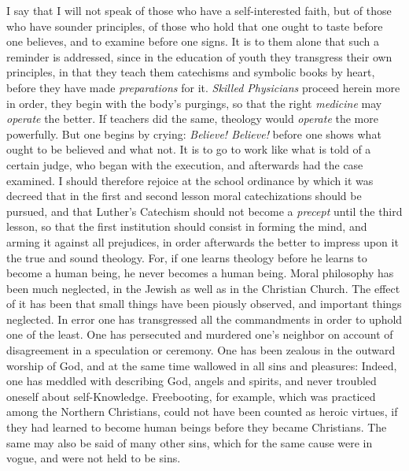 \documentclass[12pt,a4paper,openany]{book}
\newcommand{\opage}[1]{\marginnote{\footnotesize\textit{[#1]}}}
\begin{document}
I say that I will not speak of those who have a self-interested faith, but of
those who have sounder principles, of those who hold that one ought to taste
before one believes, and to examine before one signs. It is to them alone that
such a reminder is addressed, since in the education of youth they transgress
their own principles, in that they teach them catechisms and symbolic books by
heart, before they have made \textit{preparations} for it. \textit{Skilled
Physicians} proceed herein more in order, they begin with the body's purgings,
so that
the right \textit{medicine} may \textit{operate} the better. If teachers did the
same, theology would \textit{operate} the more powerfully. But one begins by
crying: \emph{Believe! Believe!} before one shows what ought to be believed and
what not. It is to go to work like what is told of a certain judge, who began
with the execution, and afterwards had the case examined. I should therefore
rejoice at the school ordinance by which it was decreed that in the first and
second lesson moral catechizations should be pursued, and that Luther's
Catechism should not become a \textit{precept} until the third lesson, so that
the first institution should consist in forming the mind, and arming it against
all prejudices, in order afterwards the better to impress upon it the true and
sound theology. For, if one learns theology before he learns to become a human
being, he never becomes a human being. Moral philosophy has been much neglected,
in the Jewish as well as in the Christian Church. The effect of it
\setcounter{footnote}{0}%
\opage{18}has been that small things have been piously observed, and important things
neglected. In error one has transgressed all the commandments in order to uphold
one of the least. One has persecuted and murdered one's neighbor on account of
disagreement in a speculation or ceremony. One has been zealous in the outward
worship of God, and at the same time wallowed in all sins and pleasures: Indeed,
one has meddled with describing God, angels and spirits, and never troubled
oneself about self-Knowledge. Freebooting, for example, which was practiced among
the Northern Christians, could not have been counted as heroic virtues, if they
had learned to become human beings before they became Christians. The same may
also be said of many other sins, which for the same cause were in vogue, and
were not held to be sins.
\end{document}
